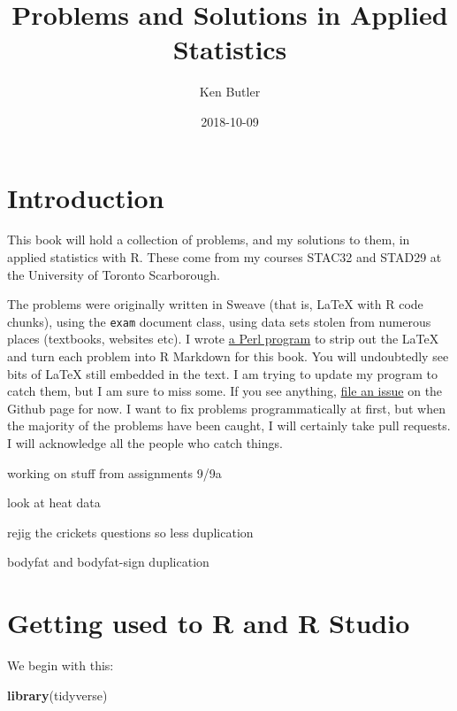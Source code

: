 \documentclass[]{tufte-book}
\title{Problems and Solutions in Applied Statistics}
\author{Ken Butler}
\date{2018-10-09}
\newenvironment{Shaded}{}{}
\newcommand{\KeywordTok}[1]{\textcolor[rgb]{0.00,0.44,0.13}{\textbf{#1}}}
\newcommand{\NormalTok}[1]{#1}
\theoremstyle{definition}
\theoremstyle{definition}
\theoremstyle{definition}
\theoremstyle{remark}
\begin{document}
\maketitle



{
\setcounter{tocdepth}{1}
\tableofcontents
}

\hypertarget{introduction}{%
\chapter{Introduction}\label{introduction}}

This book will hold a collection of problems, and my solutions to them,
in applied statistics with R. These come from my courses STAC32 and
STAD29 at the University of Toronto Scarborough.

The problems were originally written in Sweave (that is, LaTeX with R
code chunks), using the \texttt{exam} document class, using data sets
stolen from numerous places (textbooks, websites etc). I wrote
\href{https://raw.githubusercontent.com/nxskok/pasias/master/convert.pl}{a
Perl program} to strip out the LaTeX and turn each problem into R
Markdown for this book. You will undoubtedly see bits of LaTeX still
embedded in the text. I am trying to update my program to catch them,
but I am sure to miss some. If you see anything,
\href{https://github.com/nxskok/pasias/issues}{file an issue} on the
Github page for now. I want to fix problems programmatically at first,
but when the majority of the problems have been caught, I will certainly
take pull requests. I will acknowledge all the people who catch things.

working on stuff from assignments 9/9a

look at heat data

rejig the crickets questions so less duplication

bodyfat and bodyfat-sign duplication

\hypertarget{getting-used-to-r-and-r-studio}{%
\chapter{Getting used to R and R
Studio}\label{getting-used-to-r-and-r-studio}}

We begin with this:

\begin{Shaded}
\begin{Highlighting}[]
\KeywordTok{library}\NormalTok{(tidyverse)}
\end{Highlighting}
\end{Shaded}
\end{document}
